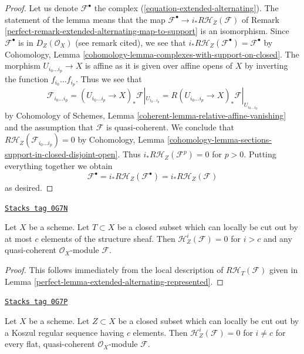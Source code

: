 \begin{proof}

Let us denote $\mathcal{F}^\bullet$ the complex
(\ref{equation-extended-alternating}).
The statement of the lemma means that the map
$\mathcal{F}^\bullet \to i_*R\mathcal{H}_Z(\mathcal{F})$
of Remark \ref{perfect-remark-extended-alternating-map-to-support}
is an isomorphism. Since $\mathcal{F}^\bullet$ is in
$D_Z(\mathcal{O}_X)$ (see remark cited), we see that
$i_*R\mathcal{H}_Z(\mathcal{F}^\bullet) = \mathcal{F}^\bullet$
by Cohomology, Lemma \ref{cohomology-lemma-complexes-with-support-on-closed}.
The morphism $U_{i_0 \ldots i_p} \to X$ is affine
as it is given over affine opens of $X$ by inverting the function
$f_{i_0} \ldots f_{i_p}$. Thus we see that
$$
\mathcal{F}_{i_0 \ldots i_p} =
(U_{i_0 \ldots i_p} \to X)_*\mathcal{F}|_{U_{i_0 \ldots i_p}} =
R(U_{i_0 \ldots i_p} \to X)_*\mathcal{F}|_{U_{i_0 \ldots i_p}}
$$
by Cohomology of Schemes, Lemma \ref{coherent-lemma-relative-affine-vanishing}
and the assumption that $\mathcal{F}$ is quasi-coherent. We conclude that
$R\mathcal{H}_Z(\mathcal{F}_{i_0 \ldots i_p}) = 0$ by Cohomology, Lemma
\ref{cohomology-lemma-sections-support-in-closed-disjoint-open}.
Thus $i_*R\mathcal{H}_Z(\mathcal{F}^p) = 0$ for $p > 0$.
Putting everything together we obtain
$$
\mathcal{F}^\bullet = i_*R\mathcal{H}_Z(\mathcal{F}^\bullet) =
i_*R\mathcal{H}_Z(\mathcal{F})
$$
as desired.
\end{proof}

\begin{lemma}
\label{perfect-lemma-supported-trivial-vanishing}
\href{https://stacks.math.columbia.edu/tag/0G7N}{\texttt{Stacks tag 0G7N}}

Let $X$ be a scheme. Let $T \subset X$ be a closed subset which can
locally be cut out by at most $c$ elements of the structure sheaf.
Then $\mathcal{H}^i_Z(\mathcal{F}) = 0$ for $i > c$ and any
quasi-coherent $\mathcal{O}_X$-module $\mathcal{F}$.
\end{lemma}

\begin{proof}

This follows immediately from the local description of
$R\mathcal{H}_T(\mathcal{F})$ given in
Lemma \ref{perfect-lemma-extended-alternating-represented}.
\end{proof}

\begin{lemma}
\label{perfect-lemma-supported-vanishing}
\href{https://stacks.math.columbia.edu/tag/0G7P}{\texttt{Stacks tag 0G7P}}

Let $X$ be a scheme. Let $Z \subset X$ be a closed subset which can
locally be cut out by a Koszul regular sequence having $c$ elements.
Then $\mathcal{H}^i_Z(\mathcal{F}) = 0$ for $i \not = c$ for every
flat, quasi-coherent $\mathcal{O}_X$-module $\mathcal{F}$.
\end{lemma}

